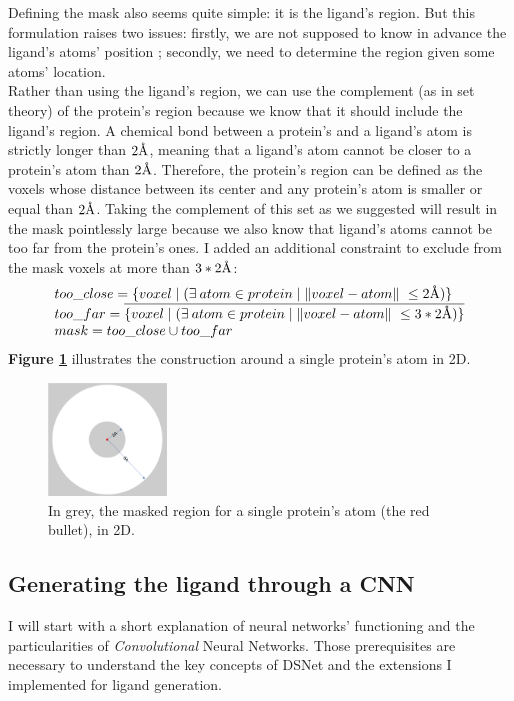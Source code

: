\documentclass{article}
\newcommand{\angstrom}{\textup{\AA}}
\begin{document}
Defining the mask also seems quite simple: it is the ligand's region. But this formulation raises two issues: firstly, we are not supposed to know in advance the ligand's atoms' position ; secondly, we need to determine the region given some atoms' location. \\
Rather than using the ligand's region, we can use the complement (as in set theory) of the protein's region because we know that it should include the ligand's region. A chemical bond between a protein's and a ligand's atom is strictly longer than $2 \angstrom$, meaning that a ligand's atom cannot be closer to a protein's atom than $2 \angstrom$. Therefore, the protein's region can be defined as the voxels whose distance between its center and any protein's atom is smaller or equal than $2 \angstrom$. Taking the complement of this set as we suggested will result in the mask pointlessly large because we also know that ligand's atoms cannot be too far from the protein's ones. I added an additional constraint to exclude from the mask voxels at more than $3*2\angstrom$:
$$
\begin{array}{ll}
    too\_close = \{voxel \mid (\exists\: atom \in protein \mid \Vert voxel - atom \Vert\ \leq 2\angstrom)\} \\
    too\_far = \overline{\{voxel \mid (\exists\: atom \in protein \mid \Vert voxel - atom \Vert\ \leq 3*2\angstrom)\}} \\
    mask = too\_close \cup too\_far
\end{array}
$$
\textbf{Figure \ref{fig:mask}} illustrates the construction around a single protein's atom in 2D.
\begin{figure}[H]
    \centering
    \includegraphics[height=3cm,width=\textwidth,keepaspectratio]{mask.png}
    \caption{In grey, the masked region for a single protein's atom (the red bullet), in 2D.}
    \label{fig:mask}
\end{figure}

\subsection{Generating the ligand through a CNN}

I will start with a short explanation of neural networks' functioning and the particularities of \textit{Convolutional} Neural Networks. Those prerequisites are necessary to understand the key concepts of DSNet \cite{DSNet} and the extensions I implemented for ligand generation.
\end{document}
